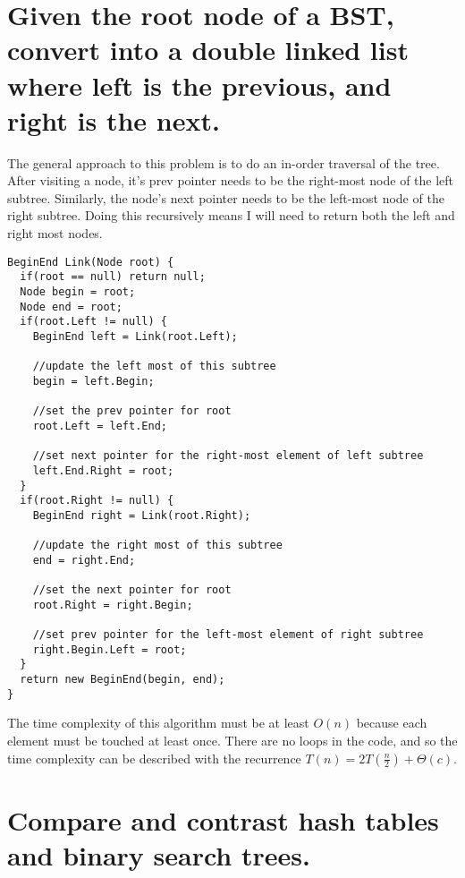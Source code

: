 \documentclass{article}
\begin{document}
\section{Given the root node of a BST, convert into a double linked list where left is the previous, and right is the next.}
The general approach to this problem is to do an in-order traversal of the tree.
After visiting a node, it's prev pointer needs to be the right-most node of the left subtree.
Similarly, the node's next pointer needs to be the left-most node of the right subtree.
Doing this recursively means I will need to return both the left and right most nodes.
\begin{lstlisting}
BeginEnd Link(Node root) {
  if(root == null) return null;
  Node begin = root;
  Node end = root;
  if(root.Left != null) {
    BeginEnd left = Link(root.Left);

    //update the left most of this subtree
    begin = left.Begin; 

    //set the prev pointer for root
    root.Left = left.End; 

    //set next pointer for the right-most element of left subtree
    left.End.Right = root; 
  }
  if(root.Right != null) {
    BeginEnd right = Link(root.Right);

    //update the right most of this subtree
    end = right.End;

    //set the next pointer for root
    root.Right = right.Begin;

    //set prev pointer for the left-most element of right subtree
    right.Begin.Left = root;
  }
  return new BeginEnd(begin, end);
}
\end{lstlisting}
The time complexity of this algorithm must be at least \(O(n)\) because each element must be touched at least once.
There are no loops in the code, and so the time complexity can be described with the recurrence \(T(n) = 2T(\frac{n}{2}) + \Theta(c)\).

\section{Compare and contrast hash tables and binary search trees.}
\end{document}
